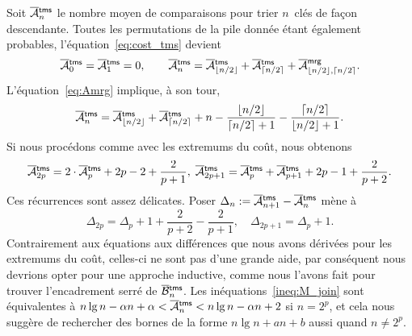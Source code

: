 Soit \(\OM{\fun{tms}}{n}\) le nombre
moyen de comparaisons pour trier \(n\)~clés de façon
descendante. Toutes les permutations de la pile donnée étant également
probables, l'équation~\eqref{eq:cost_tms} devient
\begin{equation*}
\OM{\fun{tms}}{0} = \OM{\fun{tms}}{1} = 0,\qquad
\OM{\fun{tms}}{n} = \OM{\fun{tms}}{\floor{n/2}} +
\OM{\fun{tms}}{\ceiling{n/2}} +
\OM{\fun{mrg}}{\floor{n/2},\ceiling{n/2}}.\index{mrg@\fun{mrg/2}}
\end{equation*}
L'équation~\eqref{eq:Amrg} implique, à son tour,
\begin{equation*}
\OM{\fun{tms}}{n} = \OM{\fun{tms}}{\floor{n/2}} +
\OM{\fun{tms}}{\ceiling{n/2}} + n -
\frac{\floor{n/2}}{\ceiling{n/2}+1}
- \frac{\ceiling{n/2}}{\floor{n/2}+1}.
\end{equation*}
Si nous procédons comme avec les extremums du coût, nous obtenons
\begin{equation*}
\OM{\fun{tms}}{2p} = 2\cdot\OM{\fun{tms}}{p} + 2p - 2 +
\frac{2}{p+1},\; \OM{\fun{tms}}{2p+1} = \OM{\fun{tms}}{p} +
\OM{\fun{tms}}{p+1} + 2p - 1 + \frac{2}{p+2}.
\end{equation*}
Ces récurrences sont assez délicates. Poser \(\Delta_n :=
\OM{\fun{tms}}{n+1} - \OM{\fun{tms}}{n}\) mène à
\begin{equation*}
\Delta_{2p} = \Delta_p + 1 + \frac{2}{p+2} - \frac{2}{p+1},
\quad
\Delta_{2p+1} = \Delta_{p} + 1.
\end{equation*}
Contrairement aux équations aux différences que nous avons dérivées
pour les extremums du coût, celles-ci ne sont pas d'une grande aide,
par conséquent nous devrions opter pour une approche inductive, comme
nous l'avons fait pour trouver l'encadrement serré de
\(\OB{\fun{tms}}{n}\). Les inéquations~\eqref{ineq:M_join}
 sont équivalentes à \(n\lg n - \alpha n +
\alpha < \OM{\fun{tms}}{n} < n\lg n - \alpha n + 2\) si \(n = 2^p\), et
  cela nous suggère de rechercher des bornes de la forme \(n\lg n + an
  + b\) aussi quand \(n \neq 2^p\).

